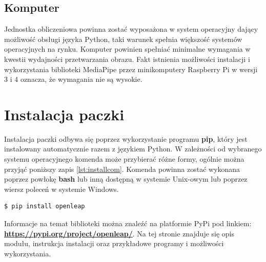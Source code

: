 \subsection{Komputer}
\quad Jednostka obliczeniowa powinna zostać wyposażona w system operacyjny dający możliwość obsługi języka Python, taki warunek spełnia większość systemów operacyjnych na rynku. Komputer powinien spełniać minimalne wymagania w kwestii wydajności przetwarzania obrazu. Fakt istnienia możliwości instalacji i wykorzystania biblioteki MediaPipe przez minikomputery Raspberry Pi w wersji 3 i 4 oznacza, że wymagania nie są wysokie. 

\section{Instalacja paczki}
\quad Instalacja paczki odbywa się poprzez wykorzystanie programu \textbf{pip}, który jest instalowany automatycznie razem z językiem Python. W zależności od wybranego systemu operacyjnego komenda może przybierać różne formy, ogólnie można przyjąć poniższy zapis \ref{lst:installcom}. Komenda powinna zostać wykonana poprzez powłokę \textbf{bash} lub inną dostępną w systemie Unix-owym lub poprzez wiersz poleceń w systemie Windows.\newline

\begin{lstlisting}[language=bash, style=command, label={lst:installcom}, caption={Instalacja paczki}]
    $ pip install openleap
\end{lstlisting}

\quad Informacje na temat biblioteki można znaleźć na platformie PyPi pod linkiem: \textbf{\href{https://pypi.org/project/openleap/}{https://pypi.org/project/openleap/}}. Na tej stronie znajduje się opis modułu, instrukcja instalacji oraz przykładowe programy i możliwości wykorzystania.

